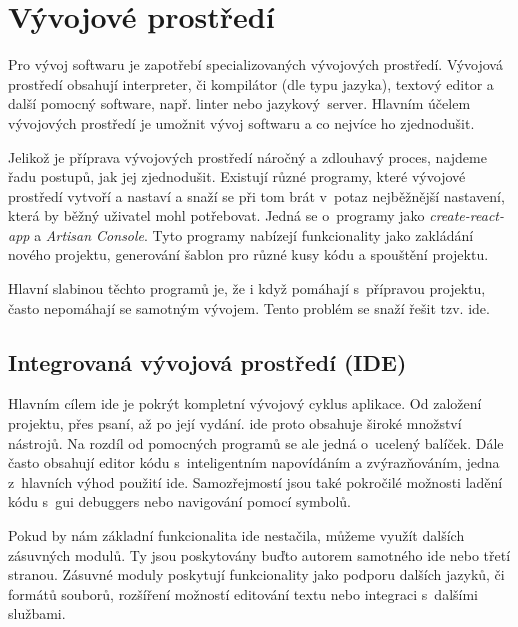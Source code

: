 \section{Vývojové prostředí}
\label{sub:development-enviroment}

Pro vývoj softwaru je zapotřebí specializovaných vývojových prostředí. Vývojová prostředí obsahují interpreter, či kompilátor (dle typu jazyka)\cite{interpreter-vs-compiler}, textový editor a další pomocný software, např. linter\cite{linter} nebo \mbox{jazykový server\cite{language-server}}. Hlavním účelem vývojových prostředí je umožnit vývoj softwaru a co nejvíce ho zjednodušit. 

Jelikož je příprava vývojových prostředí náročný a zdlouhavý proces, najdeme řadu postupů, jak jej zjednodušit. Existují různé programy, které vývojové prostředí vytvoří a nastaví a snaží se při tom brát v~potaz nejběžnější nastavení, která by běžný uživatel mohl potřebovat. Jedná se o~programy jako \emph{create-react-app}\cite{create-react-app} a \emph{Artisan Console}\cite{laravel-artisan}. Tyto programy nabízejí funkcionality jako zakládání nového projektu, generování šablon pro různé kusy kódu a spouštění projektu.

Hlavní slabinou těchto programů je, že i když pomáhají s~přípravou projektu, často nepomáhají se samotným vývojem. Tento problém se snaží řešit tzv. \acrfull{ide}\cite{ide}.  

\subsection{Integrovaná vývojová prostředí (IDE)}

Hlavním cílem \acrshort{ide} je pokrýt kompletní vývojový cyklus aplikace. Od založení projektu, přes psaní, až po její vydání.
\acrshort{ide} proto obsahuje široké množství nástrojů.
Na rozdíl od pomocných programů se ale jedná o~ucelený balíček.
Dále často obsahují editor kódu s~inteligentním napovídáním a zvýrazňováním, jedna z~hlavních výhod použití \acrshort{ide}.
Samozřejmostí jsou také pokročilé možnosti ladění kódu s~\acrshort{gui} \glspl{debugger} nebo navigování pomocí symbolů.

Pokud by nám základní funkcionalita \acrshort{ide} nestačila, můžeme využít dalších zásuvných modulů.
Ty jsou poskytovány buďto autorem samotného \acrshort{ide} nebo třetí stranou.
Zásuvné moduly poskytují funkcionality jako podporu dalších jazyků, či formátů souborů, rozšíření možností editování textu nebo integraci s~dalšími službami.
